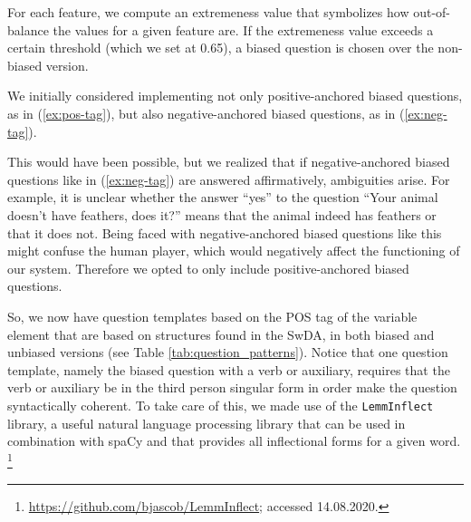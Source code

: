 \documentclass[11pt,a4paper]{article}
\begin{document}
For each feature, we compute an extremeness value that symbolizes how out-of-balance the \mbox{values} for a given feature are.
If the extremeness value exceeds a certain threshold (which we set at 0.65), a biased question is chosen over the non-biased version.

We initially considered implementing not only positive-anchored biased questions, as in (\ref{ex:pos-tag}), but also negative-anchored biased questions, as in (\ref{ex:neg-tag}).

\label{ex:pos-tag} 
\vspace{-1.25\baselineskip}
\label{ex:neg-tag}

This would have been possible, but we realized that if negative-anchored biased questions like in (\ref{ex:neg-tag}) are answered affirmatively, ambiguities arise.
For example, it is unclear whether the answer ``yes'' to the question ``Your animal doesn't have feathers, does it?'' means that the animal indeed has feathers or that it does not.
Being faced with negative-anchored biased questions like this might confuse the human player, which would negatively affect the functioning of our system.
Therefore we opted to only include positive-anchored biased questions.

So, we now have question templates based on the POS tag of the variable element that are based on structures found in the SwDA, in both biased and unbiased versions (see Table \ref{tab:question_patterns}).
Notice that one question template, namely the biased question with a verb or auxiliary, requires that the verb or auxiliary be in the third person singular form in order make the question syntactically coherent. 
To take care of this, we made use of the \texttt{LemmInflect} library, a useful natural language processing library that can be used in combination with spaCy and that provides all inflectional forms for a given word.%
	\footnote{\url{https://github.com/bjascob/LemmInflect}; accessed 14.08.2020.}
\end{document}
